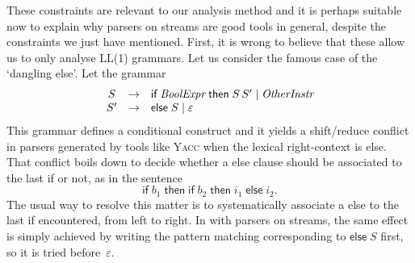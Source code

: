 These constraints are relevant to our analysis method and it is
perhaps suitable now to explain why parsers on streams are good tools
in general, despite the constraints we just have mentioned. First, it
is wrong to believe that these allow us to only analyse LL(1)
grammars. Let us consider the famous case of the `dangling else'. Let
the grammar
\begin{equation*}
\begin{array}{@{}ccl@{}}
S & \rightarrow & \textsf{if} \; \textit{BoolExpr} \;
                  \textsf{then} \; S \, S'
                  \mid \textit{OtherInstr}\\
S' & \rightarrow & \textsf{else} \; S \mid \varepsilon
\end{array}
\end{equation*}
This grammar defines a conditional construct and it yields a
shift/reduce conflict in parsers generated by tools like \textsc{Yacc}
when the lexical right\hyp{}context is \textsf{else}. That conflict
boils down to decide whether a \textsf{else} clause should be
associated to the last \textsf{if} or not, as in the sentence
\begin{equation*}
\textsf{if} \; b_1 \; \textsf{then} \; \textsf{if} \; b_2 \;
\textsf{then} \; i_1 \; \textsf{else} \; i_2.
\end{equation*}
The usual way to resolve this matter is to systematically associate a
\textsf{else} to the last \textsf{if} encountered, from left to
right. In \OCaml with parsers on streams, the same effect is simply
achieved by writing the pattern matching corresponding to
\(\textsf{else} \; S\) first, so it is tried before~\(\varepsilon\).

